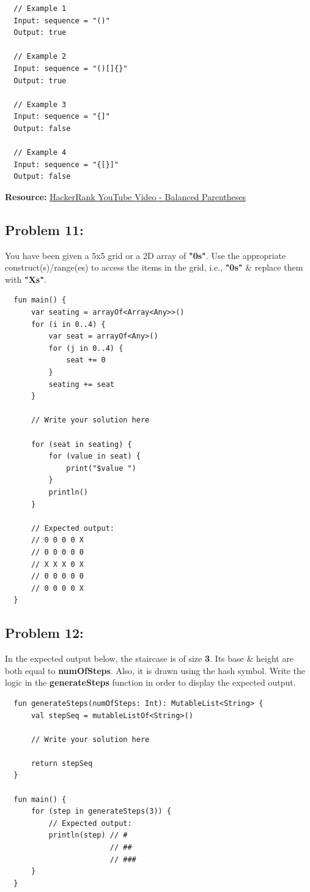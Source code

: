\documentclass{article}
\begin{document}
\begin{verbatim}
  // Example 1
  Input: sequence = "()"
  Output: true

  // Example 2
  Input: sequence = "()[]{}"
  Output: true

  // Example 3
  Input: sequence = "{]"
  Output: false

  // Example 4
  Input: sequence = "{[}]"
  Output: false
\end{verbatim}

\textbf{Resource:} \href{https://www.youtube.com/watch?v=IhJGJG-9Dx8}{HackerRank YouTube Video - Balanced Parentheses}

\subsection*{Problem 11:}
You have been given a 5x5 grid or a 2D array of \textbf{"0s"}. Use the appropriate construct(s)/range(es) to access the items in the grid, i.e., \textbf{"0s"} \& replace them with \textbf{"Xs"}.

\begin{verbatim}
  fun main() {
      var seating = arrayOf<Array<Any>>()
      for (i in 0..4) {
          var seat = arrayOf<Any>()
          for (j in 0..4) {
              seat += 0
          }
          seating += seat
      }

      // Write your solution here

      for (seat in seating) {
          for (value in seat) {
              print("$value ")
          }
          println()
      }

      // Expected output:
      // 0 0 0 0 X 
      // 0 0 0 0 0 
      // X X X 0 X 
      // 0 0 0 0 0 
      // 0 0 0 0 X
  }
\end{verbatim}

\subsection*{Problem 12:}
In the expected output below, the staircase is of size \textbf{3}. Its base \& height are both equal to \textbf{numOfSteps}. Also, it is drawn using the hash symbol. Write the logic in the \textbf{generateSteps} function in order to display the expected output.

\begin{verbatim}
  fun generateSteps(numOfSteps: Int): MutableList<String> {
      val stepSeq = mutableListOf<String>()

      // Write your solution here

      return stepSeq  
  }

  fun main() {
      for (step in generateSteps(3)) {
          // Expected output:
          println(step) // #  
                        // ## 
                        // ###
      }
  }
\end{verbatim}
\end{document}
